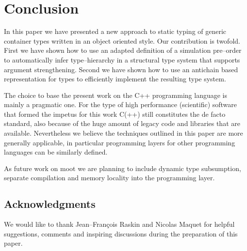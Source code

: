 \documentclass{sigplanconf}
\begin{document}
\section{Conclusion}\label{sec:conclusion}

In this paper we have presented a new approach to static typing of
generic container types written in an object oriented style. Our
contribution is twofold. First we have shown how to use an adapted
definition of a simulation pre--order to automatically infer
type--hierarchy in a structural type system that supports argument
strengthening. Second we have shown how to use an antichain based
representation for types to efficiently implement the resulting type
system.

The choice to base the present work on the C++ programming language is
mainly a pragmatic one. For the type of high performance (scientific)
software that formed the impetus for this work C(++) still constitutes
the de facto standard, also because of the huge amount of legacy code
and libraries that are available.
Nevertheless we believe the techniques outlined in this paper are more
generally applicable, in particular programming layers for other
programming languages can be similarly defined.

As future work on {\sc moot} we are planning to include dynamic type
subsumption, separate compilation and memory locality into the
programming layer.

\subsection{Acknowledgments}

We would like to thank Jean--Fran\c cois Raskin and Nicolas Maquet for
helpful suggestions, comments and inspiring discussions during the
preparation of this paper.

 
\end{document}
